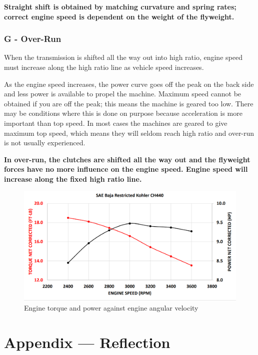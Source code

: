 \documentclass[12pt, titlepage]{article}
\begin{document}
\textbf{Straight shift is obtained by matching curvature and spring rates; correct engine speed is dependent on the weight of the flyweight.}

\subsubsection*{G - Over-Run}

When the transmission is shifted all the way out into high ratio, engine speed must increase along the high ratio line as vehicle speed increases.

As the engine speed increases, the power curve goes off the peak on the back side and less power is available to propel the machine. Maximum speed cannot be obtained if you are off the peak; this means the machine is geared too low. There may be conditions where this is done on purpose because acceleration is more important than top speed. In most cases the machines are geared to give maximum top speed, which means they will seldom reach high ratio and over-run is not usually experienced.

\textbf{In over-run, the clutches are shifted all the way out and the flyweight forces have no more influence on the engine speed. Engine speed will increase along the fixed high ratio line.} \citet{Aaen2007}

\begin{figure}[H]
  \centering
  \includegraphics[width=\textwidth]{graphs/engine.png}
  \caption{Engine torque and power against engine angular velocity \citet{BajaSAEKohlerEngine2022}}
  \label{fig:engine_graph}
\end{figure}

\newpage{}
\section*{Appendix --- Reflection}
\end{document}
